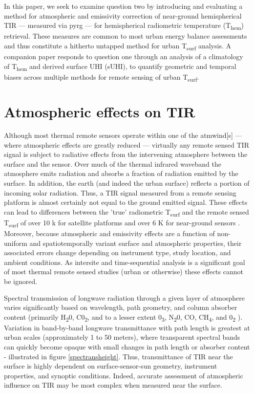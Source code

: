 \noindent In this paper, we seek to examine question two by introducing and evaluating a method for atmospheric and emissivity correction of near-ground hemispherical TIR --- measured via \gls{pyrg} --- for hemispherical radiometric temperature (T\textsubscript{hem}) retrieval. These measures are common to most urban energy balance assessments and thus constitute a hitherto untapped method for urban T\textsubscript{surf} analysis. A companion paper responds to question one through an analysis of a climatology of T\textsubscript{hem} and derived surface UHI (sUHI), to quantify geometric and temporal biases across multiple methods for remote sensing of urban T\textsubscript{surf}.

\section{Atmospheric effects on TIR}

Although most thermal remote sensors operate within one of the \gls{atmwind}[s] --- where atmospheric effects are greatly reduced --- virtually any remote sensed TIR signal is subject to radiative effects from the intervening atmosphere between the surface and the sensor. Over much of the thermal infrared \gls{waveband} the atmosphere emits radiation and absorbs a fraction of radiation emitted by the surface. In addition, the earth (and indeed the urban surface) reflects a portion of incoming solar radiation. Thus, a TIR signal measured from a remote sensing platform is almost certainly not equal to the ground emitted signal. These effects can lead to differences between the 'true' radiometric T\textsubscript{surf} and the remote sensed T\textsubscript{surf} of over 10 k for satellite platforms \cite{Cooper1989} and over 6 K for near-ground sensors \cite{Meier2011}. Moreover, because atmospheric and emissivity effects are a function of non-uniform and spatiotemporally variant surface and atmospheric properties, their associated errors change depending on instrument type, study location, and ambient conditions. As intersite and time-sequential analysis is a significant goal of most thermal remote sensed studies (urban or otherwise) these effects cannot be ignored.

Spectral transmission of longwave radiation through a given layer of atmosphere varies significantly based on wavelength, path geometry, and column absorber content (primarily H\textsubscript{2}0, C0\textsubscript{2}, and to a lesser extent 0\textsubscript{3}, N\textsubscript{2}0, CO, CH\textsubscript{4}, and 0\textsubscript{2} \cite{Miskolczi1993}). Variation in band-by-band longwave transmittance with path length is greatest at urban scales (approximately 1 to 50 meters), where transparent spectral bands can quickly become opaque with small changes in path length or absorber content - illustrated in figure \ref{spectransheight}. Thus, transmittance of TIR near the surface is highly dependent on surface-sensor-sun geometry, instrument properties, and synoptic conditions. Indeed, accurate assessment of atmospheric influence on TIR may be most complex when measured near the surface.

